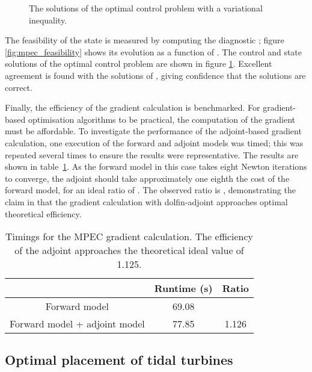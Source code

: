 \documentclass[prodmode,acmtoms]{acmsmall}
\begin{document}
\begin{figure}
\centering
        \caption{The solutions of the optimal control problem with a variational inequality.}
        \label{fig:mpec_solutions}
\end{figure}

The feasibility of the state is measured by computing the diagnostic
; figure \ref{fig:mpec_feasibility} shows its evolution as a function of . 
The control and state solutions of the optimal control problem
are shown in figure \ref{fig:mpec_solutions}. Excellent agreement is found with the solutions of , giving confidence
that the solutions are correct.

Finally, the efficiency of the gradient calculation  is benchmarked. For gradient-based optimisation
algorithms to be practical, the computation of the gradient must be affordable. To investigate the performance of the
adjoint-based gradient calculation, one execution of the forward and adjoint models was timed; this was repeated
several times to ensure the results were representative. The results are shown in table~\ref{tab:mpec-timings}. As the forward
model in this case takes eight Newton iterations to converge, the adjoint should take approximately one eighth the cost
of the forward model, for an ideal  ratio of . The observed
ratio is , demonstrating the claim in  that the gradient calculation with dolfin-adjoint 
approaches optimal theoretical efficiency.
\begin{table}
\centering
\begin{tabular}{ccc}
\toprule
       & Runtime (s) & Ratio \\
\midrule
Forward model &  69.08  &     \\
Forward model + adjoint model & 77.85 & 1.126 \\
\bottomrule
\end{tabular}
\caption{Timings for the MPEC gradient calculation. The efficiency of the adjoint approaches
the theoretical ideal value of 1.125.}
\label{tab:mpec-timings}
\end{table}
\subsection{Optimal placement of tidal turbines}\label{sec:turbine_optimisation}
\end{document}
